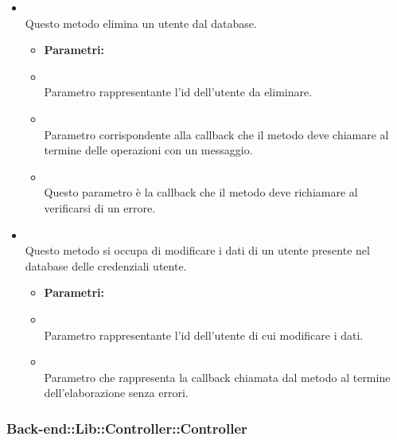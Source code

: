 \begin{itemize}
\begin{itemize}
\end{itemize}
\item[] \textbf{} \\ Questo metodo elimina un utente dal database.
\begin{itemize}\addtolength{\itemsep}{-0.5\baselineskip}
\item[] \textbf{Parametri:}
\item[]  \\ Parametro rappresentante l'id dell'utente da eliminare.
\item[]  \\ Parametro corrispondente alla callback che il metodo deve chiamare al termine delle operazioni con un messaggio.
\item[]  \\ Questo parametro è la callback che il metodo deve richiamare al verificarsi di un errore.
\end{itemize}
\item[] \textbf{} \\ Questo metodo si occupa di modificare i dati di un utente presente nel database delle credenziali utente.
\begin{itemize}\addtolength{\itemsep}{-0.5\baselineskip}
\item[] \textbf{Parametri:}
\item[]  \\ Parametro rappresentante l'id dell'utente di cui modificare i dati.
\item[]  \\ Parametro che rappresenta la callback chiamata dal metodo al termine dell'elaborazione senza errori.
\end{itemize}
\end{itemize}

	\subsubsection{Back-end::Lib::Controller::Controller} 
